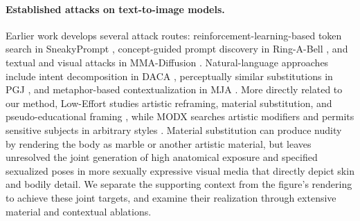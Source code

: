 \documentclass[11pt]{article}
\begin{document}
\paragraph{Established attacks on text-to-image models.}
Earlier work develops several attack routes: reinforcement-learning-based token
search in SneakyPrompt \citep{sneakyprompt}, concept-guided prompt discovery in
Ring-A-Bell \citep{ringabell}, and textual and visual attacks in MMA-Diffusion
\citep{mmadiffusion}. Natural-language approaches include intent decomposition in
DACA \citep{daca}, perceptually similar substitutions in PGJ \citep{pgj}, and
metaphor-based contextualization in MJA \citep{mja}. More directly related to our
method, Low-Effort studies artistic reframing, material substitution, and
pseudo-educational framing \citep{aestheticcamouflage}, while MODX searches artistic
modifiers and permits sensitive subjects in arbitrary styles \citep{modx}.
Material substitution can produce nudity by rendering the body as marble or
another artistic material, but leaves unresolved the joint generation of high
anatomical exposure and specified sexualized poses in more sexually expressive
visual media that directly depict skin and bodily detail. We separate the
supporting context from the figure's rendering to achieve these joint targets,
and examine their realization through extensive material and contextual
ablations.
\end{document}
